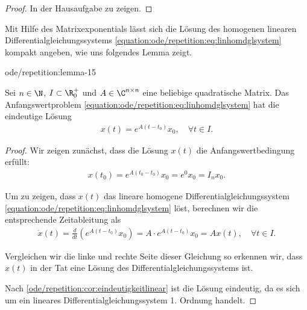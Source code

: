 \documentclass[letterpaper,10pt,english]{jupyterBook}
\begin{document}
\begin{proof}
 In der Hausaufgabe zu zeigen.
\end{proof}

\par
Mit Hilfe des Matrixexponentials lässt sich die Lösung des homogenen linearen Differentialgleichungssystems \eqref{equation:ode/repetition:eq:linhomdglsystem} kompakt angeben, wie uns folgendes Lemma zeigt.
\begin{lemma}{}{ode/repetition:lemma-15}



\par
Sei \(n\in \N\), \(I \subset \R^+_0\) und \(A \in \C^{n\times n}\) eine beliebige quadratische Matrix.
Das Anfangswertproblem \eqref{equation:ode/repetition:eq:linhomdglsystem} hat die eindeutige Lösung
\begin{align*}
x(t) = e^{A(t-t_0)}x_0, \quad \forall t \in I.
\end{align*}\end{lemma}

\begin{proof}
 Wir zeigen zunächst, dass die Lösung \(x(t)\) die Anfangswertbedingung erfüllt:
\begin{align*}
x(t_0) = e^{A(t_0-t_0)}x_0 = e^0x_0 = I_n x_0.
\end{align*}
\par
Um zu zeigen, dass \(x(t)\) das lineare homogene Differentialgleichungssystem \eqref{equation:ode/repetition:eq:linhomdglsystem} löst, berechnen wir die entsprechende Zeitableitung als
\begin{align*}
\dot{x}(t) = \frac{d}{dt}(e^{A(t-t_0)}x_0) = A \cdot e^{A(t-t_0)}x_0 = A x(t), \quad \forall t \in I.
\end{align*}
\par
Vergleichen wir die linke und rechte Seite dieser Gleichung so erkennen wir, dass \(x(t)\) in der Tat eine Lösung des Differentialgleichungssystems ist.

\par
Nach \cref{ode/repetition:cor:eindeutigkeitlinear} ist die Lösung eindeutig, da es sich um ein lineares Differentialgleichungssystem 1. Ordnung handelt.
\end{proof}
\end{document}
